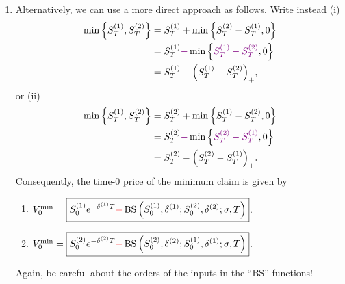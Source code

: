 \begin{enumerate}
\item \label{it:min-claim-dir-fmlas} Alternatively, we can use a more direct
approach as follows. Write instead (i)
\begin{align*}
\min\qty{S_T^{(1)},S_T^{(2)}}&=S_T^{(1)}+\min\qty{S_T^{(2)}-S_T^{(1)},0} \\
&=S_T^{(1)}{\color{violet}-}\min\qty{{\color{violet}S_T^{(1)}-S_T^{(2)}},0} \\
&=S_T^{(1)}-\qty(S_T^{(1)}-S_T^{(2)})_{+},
\end{align*}
or (ii)
\begin{align*}
\min\qty{S_T^{(1)},S_T^{(2)}}&=S_T^{(2)}+\min\qty{S_T^{(1)}-S_T^{(2)},0} \\
&=S_T^{(2)}{\color{violet}-}\min\qty{{\color{violet}S_T^{(2)}-S_T^{(1)}},0} \\
&=S_T^{(2)}-\qty(S_T^{(2)}-S_T^{(1)})_{+}.
\end{align*}
Consequently, the time-0 price of the minimum claim is given by
\begin{enumerate}[label={(\roman*)}]
\item \(V_0^{\mathrm{min}}=\boxed{S_0^{(1)}e^{-\delta^{(1)}T}{\color{red}-}\operatorname{BS}\qty(S_0^{(1)},\delta^{(1)};S_0^{(2)},\delta^{(2)};\sigma,T)}\).
\item \(V_0^{\mathrm{min}}=\boxed{S_0^{(2)}e^{-\delta^{(2)}T}{\color{red}-}\operatorname{BS}\qty(S_0^{(2)},\delta^{(2)};S_0^{(1)},\delta^{(1)};\sigma,T)}\).
\end{enumerate}
\begin{warning}
Again, be careful about the orders of the inputs in the ``BS'' functions!
\end{warning}
\end{enumerate}
